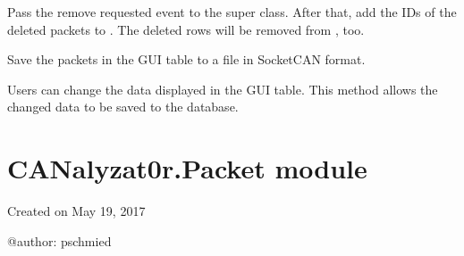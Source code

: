 \documentclass[letterpaper,10pt,english]{sphinxmanual}
\begin{document}
\begin{fulllineitems}
\begin{fulllineitems}
\end{fulllineitems}


\begin{fulllineitems}
\label{\detokenize{src:src.ManagerTab.ManagerTab.removeSelectedPackets}}
Pass the remove requested event to the super class.
After that, add the  IDs of the deleted packets to .
The deleted rows will be removed from , too.

\end{fulllineitems}


\begin{fulllineitems}
\label{\detokenize{src:src.ManagerTab.ManagerTab.saveToFile}}
Save the packets in the GUI table to a file in SocketCAN format.

\end{fulllineitems}


\begin{fulllineitems}
\label{\detokenize{src:src.ManagerTab.ManagerTab.updateDump}}
Users can change the data displayed in the GUI table. This method allows the changed data
to be saved to the database.

\end{fulllineitems}


\end{fulllineitems}



\section{CANalyzat0r.Packet module}
\label{\detokenize{src:module-src.Packet}}\label{\detokenize{src:canalyzat0r-packet-module}}
Created on May 19, 2017

@author: pschmied
\end{document}
